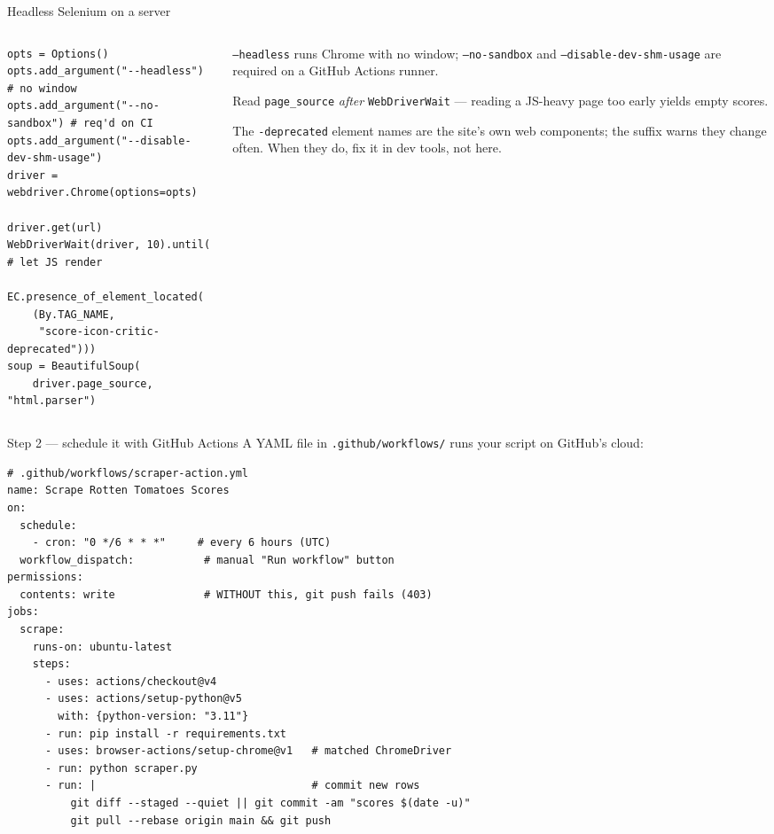 \documentclass[9pt,aspectratio=169]{beamer}
\begin{document}
\begin{frame}[fragile]{Headless Selenium on a server}
    \begin{columns}[T]
        \begin{column}{0.58\textwidth}
\begin{lstlisting}
opts = Options()
opts.add_argument("--headless")   # no window
opts.add_argument("--no-sandbox") # req'd on CI
opts.add_argument("--disable-dev-shm-usage")
driver = webdriver.Chrome(options=opts)

driver.get(url)
WebDriverWait(driver, 10).until(  # let JS render
  EC.presence_of_element_located(
    (By.TAG_NAME,
     "score-icon-critic-deprecated")))
soup = BeautifulSoup(
    driver.page_source, "html.parser")
\end{lstlisting}
        \end{column}
        \begin{column}{0.4\textwidth}
            \texttt{--headless} runs Chrome with no window; \texttt{--no-sandbox} and \texttt{--disable-dev-shm-usage} are required on a GitHub Actions runner.

            \vspace{0.6em}

            Read \texttt{page\_source} \textit{after} \texttt{WebDriverWait} --- reading a JS-heavy page too early yields empty scores.

            \vspace{0.6em}

            The \texttt{-deprecated} element names are the site's own web components; the suffix warns they change often. When they do, fix it in dev tools, not here.
        \end{column}
    \end{columns}
\end{frame}

\begin{frame}[fragile]{Step 2 --- schedule it with GitHub Actions}
    A YAML file in \texttt{.github/workflows/} runs your script on GitHub's cloud:
\begin{lstlisting}
# .github/workflows/scraper-action.yml
name: Scrape Rotten Tomatoes Scores
on:
  schedule:
    - cron: "0 */6 * * *"     # every 6 hours (UTC)
  workflow_dispatch:           # manual "Run workflow" button
permissions:
  contents: write              # WITHOUT this, git push fails (403)
jobs:
  scrape:
    runs-on: ubuntu-latest
    steps:
      - uses: actions/checkout@v4
      - uses: actions/setup-python@v5
        with: {python-version: "3.11"}
      - run: pip install -r requirements.txt
      - uses: browser-actions/setup-chrome@v1   # matched ChromeDriver
      - run: python scraper.py
      - run: |                                  # commit new rows
          git diff --staged --quiet || git commit -am "scores $(date -u)"
          git pull --rebase origin main && git push
\end{lstlisting}
\end{frame}
\end{document}
